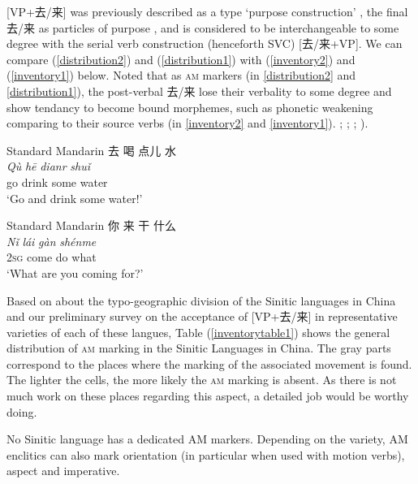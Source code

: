 \documentclass[oneside,a4paper,11pt]{article}
\newcommand{\ipa}[1]{{\phon\textit{#1}}}
\newcommand{\zh}[1]{{\cn #1}}
\newcommand{\sens}[1]{‘#1’}
\begin{document}
[VP+\zh{去/来}] was previously described as a type \sens{purpose construction} \citetext{\citealp{lu1985vpqu}; \citealp{yang2012mudi}}, the final \zh{去/来} as particles of purpose \citep[479]{chao68chinese}, and is considered to be interchangeable to some degree with the serial verb construction (henceforth SVC) [\zh{去/来}+VP]. We can compare (\ref{distribution2}) and (\ref{distribution1}) with (\ref{inventory2}) and (\ref{inventory1}) below. Noted that as \textsc{am} markers (in \ref{distribution2} and \ref{distribution1}), the post-verbal \zh{去/来} lose their verbality to some degree and show tendancy to become bound morphemes, such as phonetic weakening comparing to their source verbs (in \ref{inventory2} and \ref{inventory1}). \citealp[479]{chao68chinese}; \citealp{lu1985vpqu}; \cite{lamarre17motion.cum} ; \cite{lamarre17deictic}).

\begin{exe}
\ex Standard Mandarin \citep{lamarre17deictic} \label{inventory2}
\glll
\zh{去} \zh{喝} \zh{点儿} \zh{水} \\
\ipa{Qù} \ipa{hē} \ipa{dianr} \ipa{shuǐ} \\
go drink some water \\
\glt \sens{Go and drink some water!}
\end{exe}


\begin{exe}
\ex Standard Mandarin \label{inventory1}
\glll
\zh{你} \zh{来} \zh{干} \zh{什么}  \\
\ipa{Nǐ} \ipa{lái} \ipa{gàn} \ipa{shénme}  \\
\textsc{2sg} come do what \\
 \glt \sens{What are you coming for?}
\end{exe}
Based on \cite{chappell15areas} about the typo-geographic division of the Sinitic languages in China and our preliminary survey on the acceptance of [VP+\zh{去/来}] in representative varieties of each of these langues, Table (\ref{inventorytable1}) shows the general distribution of \textsc{am} marking in the Sinitic Languages in China. The gray parts correspond to the places where the marking of the associated movement is found. The lighter the cells, the more likely the \textsc{am} marking is absent. As there is not much work on these places regarding this aspect, a detailed job would be worthy doing. 

No Sinitic language has a dedicated AM markers. Depending on the variety, AM enclitics can also mark orientation (in particular when used with motion verbs), aspect and imperative.
\end{document}
